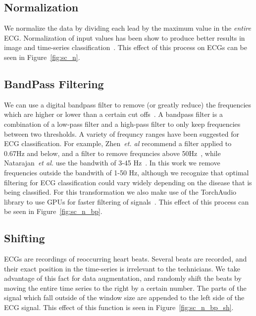 \documentclass{article}
\begin{document}
\subsection{Normalization}
We normalize the data by dividing each lead by the maximum value in the \textit{entire} ECG. Normalization of input values has been show to produce better results in image and time-series classification~\cite{bhanja2018impact}. This effect of this process on ECGs can be seen in Figure~\ref{fig:sc_n}.
\subsection{BandPass Filtering}

We can use a digital bandpass filter to remove (or greatly reduce) the frequencies which are higher or lower than a certain cut offs~\cite{lyons1997understanding}. A bandpass filter is a combination of a low-pass filter and a high-pass filter to only keep frequencies between two thresholds. A variety of frequncy ranges have been suggested for ECG classification. For example, Zhen~\textit{et. al} recommend a filter applied to 0.67Hz and below, and a filter to remove frequncies above 50Hz~\cite{zheng202012}, while Natarajan~\textit{et al.} use the bandwith of 3-45 Hz~\cite{natarajan2020wide}. In this work we remove frequencies outside the bandwith of 1-50 Hz, although we recognize that optimal filtering for ECG classification could vary widely depending on the disease that is being classified. For this transformation we also make use of the TorchAudio library to use GPUs for faster filtering of signals~\cite{yang2021torchaudio}. This effect of this process can be seen in Figure~\ref{fig:sc_n_bp}.
\subsection{Shifting}
ECGs are recordings of reoccurring heart beats. Several beats are recorded, and their exact position in the time-series is irrelevant to the technicians. We take advantage of this fact for data augmentation, and randomly shift the beats by moving the entire time series to the right by a certain number. The parts of the signal which fall outside of the window size are appended to the left side of the ECG signal. This effect of this function is seen in Figure~\ref{fig:sc_n_bp_sh}.
\end{document}
